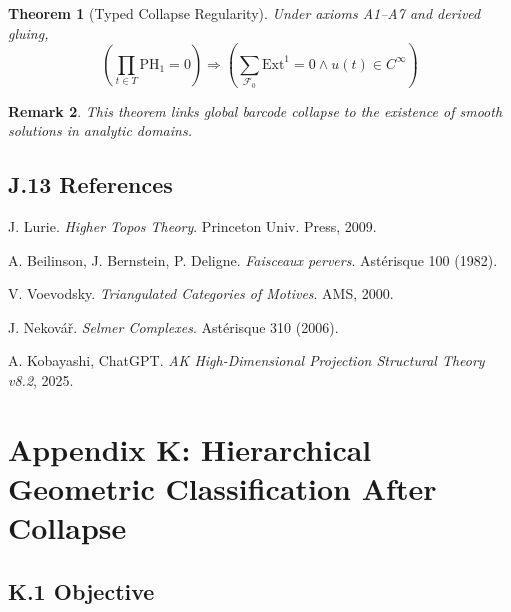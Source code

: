 \documentclass[11pt]{article}
\newtheorem{theorem}{Theorem}[section]
\newtheorem{remark}[theorem]{Remark}
\begin{document}
\begin{axiom}
\begin{axiom}
\begin{theorem}[Typed Collapse Regularity]
Under axioms A1–A7 and derived gluing,
\[
\boxed{
\left( \prod_{t \in T} \mathrm{PH}_1 = 0 \right)
\Rightarrow
\left( \sum_{\mathcal{F}_0} \mathrm{Ext}^1 = 0 \wedge u(t) \in C^\infty \right)
}
\]
\end{theorem}

\begin{remark}
This theorem links global barcode collapse to the existence of smooth solutions in analytic domains.
\end{remark}


\subsection*{J.13 References}

\begin{thebibliography}{9}

J. Lurie.  
\textit{Higher Topos Theory}. Princeton Univ. Press, 2009.

A. Beilinson, J. Bernstein, P. Deligne.  
\textit{Faisceaux pervers}. Astérisque 100 (1982).

V. Voevodsky.  
\textit{Triangulated Categories of Motives}. AMS, 2000.

J. Nekovář.  
\textit{Selmer Complexes}. Astérisque 310 (2006).

A. Kobayashi, ChatGPT.  
\textit{AK High-Dimensional Projection Structural Theory v8.2}, 2025.

\end{thebibliography}




\section*{Appendix K: Hierarchical Geometric Classification After Collapse}

\subsection*{K.1 Objective}


\end{axiom}
\end{axiom}
\end{document}
